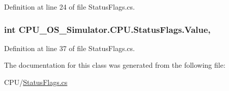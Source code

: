Definition at line 24 of file Status\+Flags.\+cs.

\hypertarget{class_c_p_u___o_s___simulator_1_1_c_p_u_1_1_status_flags_a2978a3bc6493134bb9546c879e625fc2}{}
\subsubsection[{Value}]{\setlength{\rightskip}{0pt plus 5cm}int C\+P\+U\+\_\+\+O\+S\+\_\+\+Simulator.\+C\+P\+U.\+Status\+Flags.\+Value\hspace{0.3cm}{\ttfamily [get]}, {\ttfamily [set]}}\label{class_c_p_u___o_s___simulator_1_1_c_p_u_1_1_status_flags_a2978a3bc6493134bb9546c879e625fc2}


Definition at line 37 of file Status\+Flags.\+cs.



The documentation for this class was generated from the following file\+:\begin{DoxyCompactItemize}
\item 
C\+P\+U/\hyperlink{_status_flags_8cs}{Status\+Flags.\+cs}\end{DoxyCompactItemize}
